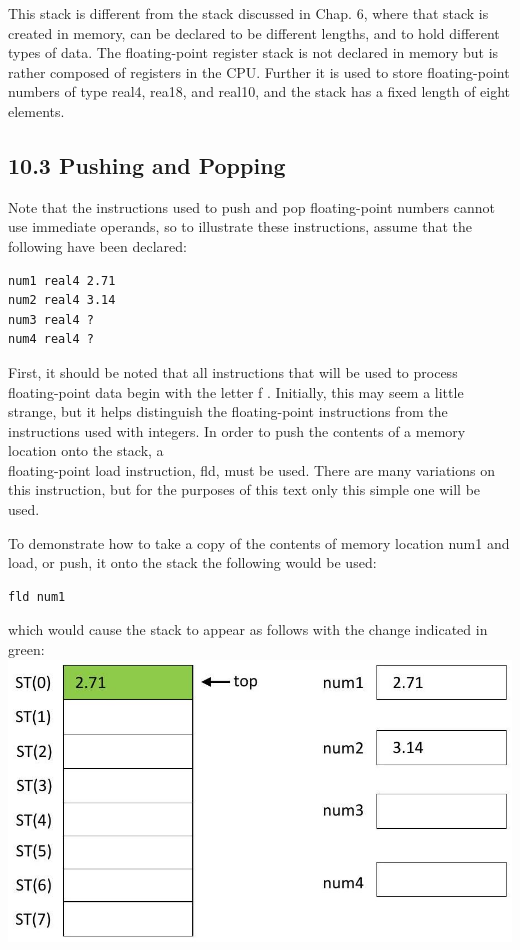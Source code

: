 \documentclass[10pt]{article}
\begin{document}
This stack is different from the stack discussed in Chap. 6, where that stack is created in memory, can be declared to be different lengths, and to hold different types of data. The floating-point register stack is not declared in memory but is rather composed of registers in the CPU. Further it is used to store floating-point numbers of type real4, rea18, and real10, and the stack has a fixed length of eight elements.

\subsection*{10.3 Pushing and Popping}
Note that the instructions used to push and pop floating-point numbers cannot use immediate operands, so to illustrate these instructions, assume that the following have been declared:

\begin{verbatim}
num1 real4 2.71
num2 real4 3.14
num3 real4 ?
num4 real4 ?
\end{verbatim}

First, it should be noted that all instructions that will be used to process floating-point data begin with the letter f . Initially, this may seem a little strange, but it helps distinguish the floating-point instructions from the instructions used with integers. In order to push the contents of a memory location onto the stack, a\\
floating-point load instruction, fld, must be used. There are many variations on this instruction, but for the purposes of this text only this simple one will be used.

To demonstrate how to take a copy of the contents of memory location num1 and load, or push, it onto the stack the following would be used:

\begin{verbatim}
fld num1
\end{verbatim}

which would cause the stack to appear as follows with the change indicated in green:\\
\includegraphics[max width=\textwidth, center]{2025_03_24_ebe50cc223a6fbc49eecg-222}
\end{document}

